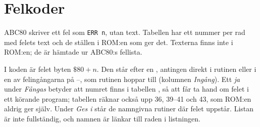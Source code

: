 
\chapter{Felkoder}\label{bil:felkoder}
\noindent ABC80 skriver ett fel som \texttt{ERR n}, utan text. Tabellen
har ett nummer per rad med felets text och de ställen i ROM:en som ger
det. Texterna finns inte i ROM:en; de är hämtade ur ABC80:s fellista.
\par\smallskip\noindent I koden är felet byten $\$80+n$. Den står efter en
, antingen direkt i rutinen eller i en av felingångarna på
–, som rutinen hoppar till (kolumnen
\emph{Ingång}). Ett \emph{ja} under \emph{Fångas} betyder att numret finns i
tabellen , så att  får ta hand om felet i
ett körande program; tabellen räknar också upp 36, 39–41 och 43, som
ROM:en aldrig ger själv. Under \emph{Ges i} står de namngivna rutiner där
felet uppstår. Listan är inte fullständig, och namnen är länkar till
raden i listningen.\par\medskip
\TabNeed{30mm}
